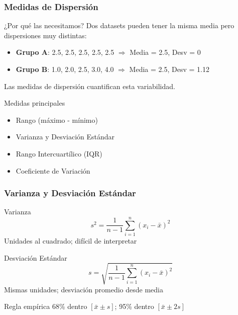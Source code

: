 \documentclass[aspectratio=169,11pt]{beamer}
\begin{document}
\begin{frame}[fragile]
\frametitle{Medidas de Dispersión}

\begin{exampleblock}{¿Por qué las necesitamos?}
  Dos datasets pueden tener la misma media pero dispersiones muy distintas:

  \begin{itemize}
    \item \textbf{Grupo A}: 2.5, 2.5, 2.5, 2.5, 2.5 $\Rightarrow$ Media = 2.5, Desv = 0
    \item \textbf{Grupo B}: 1.0, 2.0, 2.5, 3.0, 4.0 $\Rightarrow$ Media = 2.5, Desv = 1.12
  \end{itemize}

  Las medidas de dispersión cuantifican esta variabilidad.
\end{exampleblock}

\pause

\begin{block}{Medidas principales}
  \begin{itemize}
    \item Rango (máximo - mínimo)
    \item Varianza y Desviación Estándar
    \item Rango Intercuartílico (IQR)
    \item Coeficiente de Variación
  \end{itemize}
\end{block}
\end{frame}

\begin{frame}[fragile]
\frametitle{Varianza y Desviación Estándar}
\small

\begin{block}{Varianza}
  $$s^2 = \frac{1}{n-1} \sum_{i=1}^{n} (x_i - \bar{x})^2$$
  Unidades al cuadrado; difícil de interpretar
\end{block}

\pause

\begin{block}{Desviación Estándar}
  $$s = \sqrt{\frac{1}{n-1} \sum_{i=1}^{n} (x_i - \bar{x})^2}$$
  Mismas unidades; desviación promedio desde media
\end{block}

\pause

\begin{alertblock}{Regla empírica}
  68\% dentro $[\bar{x} \pm s]$; 95\% dentro $[\bar{x} \pm 2s]$
\end{alertblock}
\end{frame}
\end{document}
